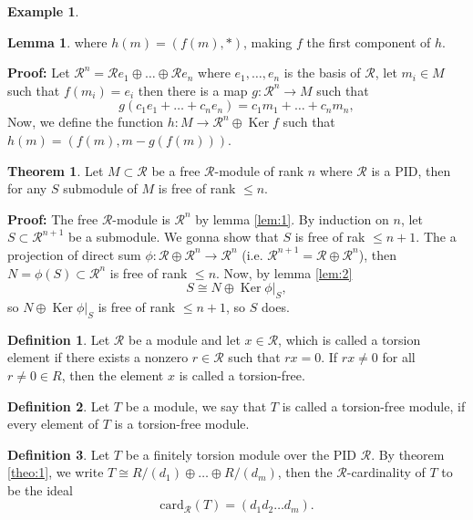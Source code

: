 \documentclass[11pt]{amsbook}%
\theoremstyle{plain}
\theoremstyle{definition}
\newtheorem{definition*}{Definition}
\newtheorem*{example*}{Example}
\newtheorem{lemma}{Lemma}
\newtheorem{theorem}{Theorem}
\numberwithin{equation}{section}
\newcommand{\CR}{\mathcal R}
\newcommand{\card}{\text{card}}
\renewcommand{\proof}{ \textbf{Proof: }}
\DeclareMathOperator{\Ker}{Ker}
\begin{document}
\begin{example*}
\begin{lemma}
  where $h(m) = (f(m), *)$, making $f$ the first component of $h$.
\end{lemma} \vspace{1.8em}
\proof Let $\CR^{n} = \CR e_{1} \oplus \dots \oplus \CR e_{n}$ where
$e_{1}, \dots, e_{n}$ is the basis of $\CR$, let $m_{i} \in M$ such that
$f(m_{i}) = e_{i}$ then there is a map $g: \CR^{n} \longrightarrow M$ such that
$$
g(c_{1}e_{1} + \dots + c_{n}e_{n}) = c_{1}m_{1} + \dots + c_{n}m_{n},
$$
Now, we define the function $h: M \longrightarrow \CR^{n} \oplus \Ker f$ such that
$h(m) = (f(m), m - g(f(m)))$. \qedsymbol
\begin{theorem}
  \label{theo:2}
  Let $M \subset \CR$ be a free $\CR$-module of rank $n$ where $\CR$ is a PID,
  then for any $S$ submodule of $M$ is free of rank $\leq n$.
\end{theorem} \vspace{1.8em}
\proof The free $\CR$-module is $\CR^{n}$ by lemma \ref{lem:1}. By induction on $n$, let $S \subset \CR^{n+1}$ be a submodule.
We gonna show that $S$ is free of rak $\leq n+1$. The a projection of direct
sum $\phi: \CR \oplus \CR^{n} \longrightarrow \CR^{n}$ (i.e. $\CR^{n+1} = \CR \oplus \CR^{n}$), then $N = \phi(S) \subset \CR^{n}$ is free of rank $\leq n$.
Now, by lemma \ref{lem:2}
$$
S \cong N \oplus \Ker \phi \vert_{S},
$$
so $N \oplus \Ker \phi \vert_{S}$ is free of rank $\leq n+1$, so $S$ does. \qedsymbol

\begin{definition*}
  Let $\CR$ be a module and let $x \in \CR$, which is called a torsion
  element if there exists a nonzero $r \in \CR$ such that $rx = 0$. If $rx \neq 0$ for all $r \neq 0 \in R$, then the element $x$ is called a torsion-free.
\end{definition*}

\begin{definition*}
  Let $T$ be a module, we say that $T$ is called a torsion-free module, if every
  element of $T$ is a torsion-free module.
\end{definition*}

\begin{definition*}
  Let $T$ be a finitely torsion module over the PID $\CR$. By theorem \ref{theo:1},
  we write $T \cong R/(d_{1}) \oplus \dots \oplus R/(d_{m})$, then the $\CR$-cardinality of $T$ to be the ideal
  $$
  \card_{\CR}(T) = (d_{1}d_{2} \dots d_{m}).
  $$
\end{definition*}


\end{example*}
\end{document}
